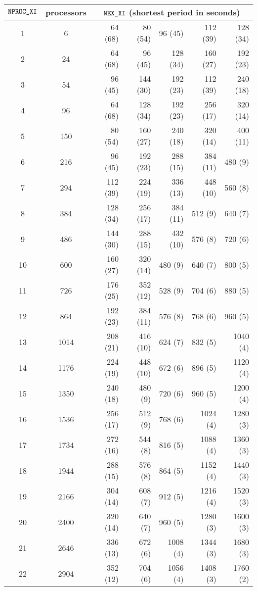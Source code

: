 \documentclass[onecolumn]{article}
\newcommand{\nexxi}{\mbox{\texttt{NEX\_XI}}}
\newcommand{\nprocxi}{\mbox{\texttt{NPROC\_XI}}}
\begin{document}
\begin{table}[t]
\begin{tabular}{|c|c|rrrrr|} \hline
\multicolumn{1}{|c|}{$\nprocxi$} & \multicolumn{1}{|c|}{processors} &
\multicolumn{5}{|c|}{$\nexxi$ (shortest period in seconds)} \\ \hline
1 & 6 & 64 (68) & 80 (54) & 96 (45) & 112 (39) & 128 (34) \\
2 & 24 & 64 (68) & 96 (45) & 128 (34) & 160 (27) & 192 (23) \\
3 & 54 & 96 (45) & 144 (30) & 192 (23) & 112 (39) & 240 (18) \\
4 & 96 & 64 (68) & 128 (34) & 192 (23) & 256 (17) & 320 (14) \\
5 & 150 & 80 (54) & 160 (27) & 240 (18) & 320 (14) & 400 (11) \\
6 & 216 & 96 (45) & 192 (23) & 288 (15) & 384 (11) & 480 (9) \\
7 & 294 & 112 (39) & 224 (19) & 336 (13) & 448 (10) & 560 (8) \\
8 & 384 & 128 (34) & 256 (17) & 384 (11) & 512 (9) & 640 (7) \\
9 & 486 & 144 (30) & 288 (15) & 432 (10) & 576 (8) & 720 (6) \\
10 & 600 & 160 (27) & 320 (14) & 480 (9) & 640 (7) & 800 (5) \\
11 & 726 & 176 (25) & 352 (12) & 528 (9) & 704 (6) & 880 (5) \\
12 & 864 & 192 (23) & 384 (11) & 576 (8) & 768 (6) & 960 (5) \\
13 & 1014 & 208 (21) & 416 (10) & 624 (7) & 832 (5) & 1040 (4) \\
14 & 1176 & 224 (19) & 448 (10) & 672 (6) & 896 (5) & 1120 (4) \\
15 & 1350 & 240 (18) & 480 (9) & 720 (6) & 960 (5) & 1200 (4) \\
16 & 1536 & 256 (17) & 512 (9) & 768 (6) & 1024 (4) & 1280 (3) \\
17 & 1734 & 272 (16) & 544 (8) & 816 (5) & 1088 (4) & 1360 (3) \\
18 & 1944 & 288 (15) & 576 (8) & 864 (5) & 1152 (4) & 1440 (3) \\
19 & 2166 & 304 (14) & 608 (7) & 912 (5) & 1216 (4) & 1520 (3) \\
20 & 2400 & 320 (14) & 640 (7) & 960 (5) & 1280 (3) & 1600 (3) \\
21 & 2646 & 336 (13) & 672 (6) & 1008 (4) & 1344 (3) & 1680 (3) \\
22 & 2904 & 352 (12) & 704 (6) & 1056 (4) & 1408 (3) & 1760 (2) \\

\end{tabular}
\end{table}
\end{document}
